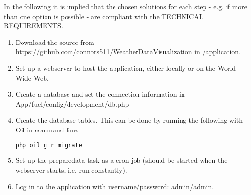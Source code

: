 In the following it is implied that the chosen solutions for each step - e.g. if more than one option is possible - are compliant with the TECHNICAL REQUIREMENTS.

\begin{enumerate}
\item Download the source from \url{https://github.com/connors511/WeatherDataVisualization} in \textsf{/application}.
\item Set up a webserver to host the application, either locally or on the World Wide Web.
\item Create a database and set the connection information in \textsf{App/fuel/config/development/db.php}
\item Create the database tables. This can be done by running the following with \textsf{Oil} in command line:
\begin{lstlisting}[language=sh]
php oil g r migrate
\end{lstlisting}
\item Set up the \textsf{preparedata} task as a cron job (should be started when the webserver starts, i.e. run constantly).
\item Log in to the application with username/password: \textsf{admin/admin}.
\end{enumerate}
